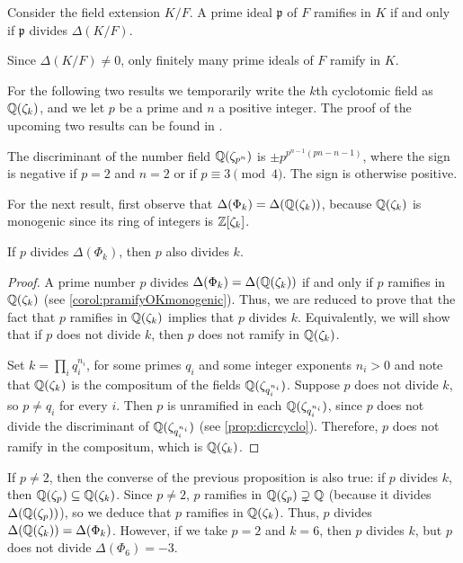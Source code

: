 \documentclass[../main.tex]{subfiles}
\begin{document}
\begin{corollary}\label{corol:pramifyOKmonogenic}
	Consider the field extension $K/F$. A prime ideal $\mathfrak{p}$ of $F$ ramifies in $K$ if and only if $\mathfrak{p}$ divides $\Delta(K/F)$.
\end{corollary} 

\begin{remark}\label{remark:finiteprimesramify}
	Since $\Delta(K/F)\neq 0$, only finitely many prime ideals of $F$ ramify in $K$.
\end{remark}

For the following two results we temporarily write the $k$th cyclotomic field as $\mathbb{Q}(\zeta_k)$, and we let $p$ be a prime and $n$ a positive integer. The proof of the upcoming two results can be found in \cite[Chapter 2]{Washington}.
\begin{proposition}\label{prop:dicrcyclo}
	The discriminant of the number field $\mathbb{Q}(\zeta_{p^{n}})$ is $\pm p^{p^{n-1}(pn-n-1)}$, where the sign is negative if $p=2$ and $n=2$ or if $p\equiv 3\pmod{4}$. The sign is otherwise positive.
\end{proposition}

 For the next result, first observe that $\Delta(\Phi_k)=\Delta({\mathbb{Q}(\zeta_k)})$, because $\mathbb{Q}(\zeta_k)$ is monogenic since its ring of integers is $\mathbb{Z}[\zeta_k]$. 
\begin{proposition}\label{prop:discprimediv}
	If $p$ divides $\Delta(\Phi_k)$, then $p$ also divides $k$.
\end{proposition}
\begin{proof}
	 A prime number $p$ divides $\Delta(\Phi_k)=\Delta({\mathbb{Q}(\zeta_k)})$  if and only if $p$ ramifies in $\mathbb{Q}(\zeta_k)$ (see \cref{corol:pramifyOKmonogenic}). Thus, we are reduced to prove that the fact that $p$ ramifies in $\mathbb{Q}(\zeta_k)$ implies that $p$ divides $k$. Equivalently, we will show that if $p$ does not divide $k$, then $p$ does not ramify in $\mathbb{Q}(\zeta_k)$.
	
	Set $k=\prod_iq_i^{n_i}$, for some primes $q_i$ and some integer exponents $n_i>0$ and note that $\mathbb{Q}(\zeta_k)$ is the compositum of the fields $\mathbb{Q}(\zeta_{q_i^{n_i}})$. Suppose $p$ does not divide $k$, so $p\neq q_i$ for every $i$. Then $p$ is unramified in each $\mathbb{Q}(\zeta_{q_i^{n_i}})$, since $p$ does not divide the discriminant of $\mathbb{Q}(\zeta_{q_i^{n_i}})$ (see \cref{prop:dicrcyclo}). Therefore, $p$ does not ramify in the compositum, which is $\mathbb{Q}(\zeta_k)$.
\end{proof}

If $p\neq 2$, then the converse of the previous proposition is also true: if $p$ divides $k$, then $\mathbb{Q}(\zeta_p)\subseteq\mathbb{Q}(\zeta_k)$. Since $p\neq 2$, $p$ ramifies in $\mathbb{Q}(\zeta_p)\supsetneq \mathbb{Q}$ (because it divides $\Delta(\mathbb{Q}(\zeta_p))$), so we deduce that $p$ ramifies in $\mathbb{Q}(\zeta_k)$. Thus, $p$ divides $\Delta({\mathbb{Q}(\zeta_k)})=\Delta(\Phi_k)$. However, if we take $p=2$ and $k=6$, then $p$ divides $k$, but $p$ does not divide $\Delta(\Phi_6)=-3$.
\end{document}
